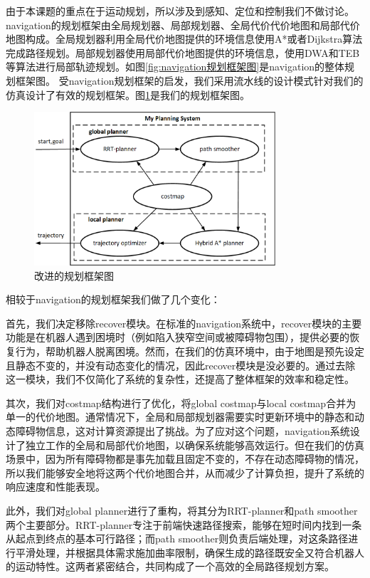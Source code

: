 \documentclass[master,academic]{ysuthesis} %
\begin{document}
	由于本课题的重点在于运动规划，所以涉及到感知、定位和控制我们不做讨论。navigation的规划框架由全局规划器、局部规划器、全局代价代价地图和局部代价地图构成。全局规划器利用全局代价地图提供的环境信息使用A*或者Dijkstra算法完成路径规划。局部规划器使用局部代价地图提供的环境信息，使用DWA和TEB等算法进行局部轨迹规划。如图\ref{fig:navigation规划框架图}是navigation的整体规划框架图。
	受navigation规划框架的启发，我们采用流水线的设计模式针对我们的仿真设计了有效的规划框架。图\ref{fig:改进的规划框架图}是我们的规划框架图。
	\begin{figure}[!ht]
		\centering
		\includegraphics[width=0.8\textwidth]{我的规划框架.png}
		\caption{改进的规划框架图}
		\label{fig:改进的规划框架图}
	\end{figure}
	相较于navigation的规划框架我们做了几个变化：

	首先，我们决定移除recover模块。在标准的navigation系统中，recover模块的主要功能是在机器人遇到困境时（例如陷入狭窄空间或被障碍物包围），提供必要的恢复行为，帮助机器人脱离困境。然而，在我们的仿真环境中，由于地图是预先设定且静态不变的，并没有动态变化的情况，因此recover模块是没必要的。通过去除这一模块，我们不仅简化了系统的复杂性，还提高了整体框架的效率和稳定性。

	其次，我们对costmap结构进行了优化，将global costmap与local costmap合并为单一的代价地图。通常情况下，全局和局部规划器需要实时更新环境中的静态和动态障碍物信息，这对计算资源提出了挑战。为了应对这个问题，navigation系统设计了独立工作的全局和局部代价地图，以确保系统能够高效运行。但在我们的仿真场景中，因为所有障碍物都是事先加载且固定不变的，不存在动态障碍物的情况，所以我们能够安全地将这两个代价地图合并，从而减少了计算负担，提升了系统的响应速度和性能表现。

	此外，我们对global planner进行了重构，将其分为RRT-planner和path smoother两个主要部分。RRT-planner专注于前端快速路径搜索，能够在短时间内找到一条从起点到终点的基本可行路径；而path smoother则负责后端处理，对这条路径进行平滑处理，并根据具体需求施加曲率限制，确保生成的路径既安全又符合机器人的运动特性。这两者紧密结合，共同构成了一个高效的全局路径规划方案。
\end{document}

